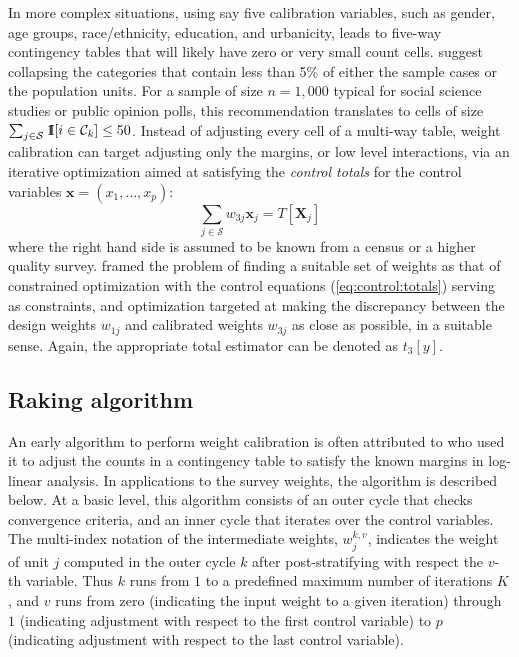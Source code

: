 In more complex situations, using say five calibration variables,
such as gender, age groups, race/ethnicity, education, and urbanicity,
leads to five-way contingency tables that will likely have zero or
very small count cells. \citet{batt:izra:hoag:fran:2009} suggest
collapsing the categories that contain less than 5\% of either
the sample cases or the population units. For a sample of size
$n=1,000$ typical for social science studies or public opinion polls,
this recommendation translates to cells of size
$\sum_{j \in \mathcal{S}} {\rm 1\kern-.3em I}[i \in \mathcal{C}_k] \le 50$.
Instead of adjusting every cell of a multi-way table, weight calibration 
can target adjusting only the margins, or low level interactions,
via an iterative optimization aimed at satisfying
the {\it control totals} for the control variables $\mathbf{x}=(x_1, \ldots, x_p)$:
\begin{equation}
    \sum_{j \in \mathcal{S}} w_{3j} \mathbf{x}_j
    = T [ \mathbf{X}_j  ]
    \label{eq:control:totals}
\end{equation}
where the right hand side is assumed to be known from a census or
a higher quality survey.
\citet{deville:sarndal:1992} framed the problem of finding a suitable
set of weights as that of constrained optimization with the control
equations (\ref{eq:control:totals}) serving as constraints,
and optimization targeted at making the discrepancy between
the design weights $w_{1j}$ and calibrated weights
$w_{3j}$ as close as possible, in a suitable sense. Again,
the appropriate total estimator can be denoted as $t_3[y]$.

\subsection{Raking algorithm}
\label{subsec:raking:algorithm}

An early algorithm to perform weight calibration is often attributed to
\citet{deming:stephan:1940} who used it to adjust the counts in a contingency
table to satisfy the known margins in log-linear analysis.
In applications to the survey weights, the algorithm is described below.
At a basic level, this algorithm consists of an outer cycle that checks
convergence criteria, and an inner cycle that iterates over the control
variables. The multi-index notation of the intermediate weights,
$w_j^{k,v}$, indicates the weight of unit $j$ computed in the outer cycle $k$
after post-stratifying with respect the $v$-th variable. Thus $k$ runs from $1$
to a predefined maximum number of iterations $K$, and $v$ runs from zero
(indicating the input weight to a given iteration) through $1$ (indicating
adjustment with respect to the first control variable) to $p$ (indicating
adjustment with respect to the last control variable).

